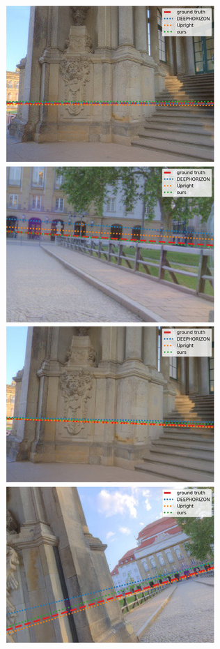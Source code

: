 \includegraphics{horizon_estimation/thumb/pano_additeyvjdqubv-2.jpg}
\includegraphics{horizon_estimation/thumb/pano_additeyvjdqubv-3.jpg}
\includegraphics{horizon_estimation/thumb/pano_additeyvjdqubv-4.jpg}
\includegraphics{horizon_estimation/thumb/pano_additeyvjdqubv-6.jpg}
